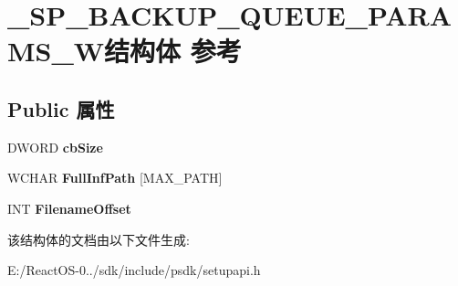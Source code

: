 \hypertarget{struct___s_p___b_a_c_k_u_p___q_u_e_u_e___p_a_r_a_m_s___w}{}\section{\+\_\+\+S\+P\+\_\+\+B\+A\+C\+K\+U\+P\+\_\+\+Q\+U\+E\+U\+E\+\_\+\+P\+A\+R\+A\+M\+S\+\_\+\+W结构体 参考}
\label{struct___s_p___b_a_c_k_u_p___q_u_e_u_e___p_a_r_a_m_s___w}
\subsection*{Public 属性}
\begin{DoxyCompactItemize}
\item 
\mbox{\label{struct___s_p___b_a_c_k_u_p___q_u_e_u_e___p_a_r_a_m_s___w_a0c94832b7e23cce5ded8dcaa39148bb5}} 
D\+W\+O\+RD {\bfseries cb\+Size}
\item 
\mbox{\label{struct___s_p___b_a_c_k_u_p___q_u_e_u_e___p_a_r_a_m_s___w_a174fedf646fe970a062ab40ca8812724}} 
W\+C\+H\+AR {\bfseries Full\+Inf\+Path} \mbox{[}M\+A\+X\+\_\+\+P\+A\+TH\mbox{]}
\item 
\mbox{\label{struct___s_p___b_a_c_k_u_p___q_u_e_u_e___p_a_r_a_m_s___w_a15b8198122174640d465d3fa64ef2ea1}} 
I\+NT {\bfseries Filename\+Offset}
\end{DoxyCompactItemize}


该结构体的文档由以下文件生成\+:\begin{DoxyCompactItemize}
\item 
E\+:/\+React\+O\+S-\/0../sdk/include/psdk/setupapi.\+h\end{DoxyCompactItemize}
